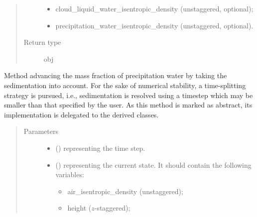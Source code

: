 \documentclass[letterpaper,10pt,english]{sphinxmanual}
\begin{document}
\begin{fulllineitems}
\begin{fulllineitems}
\begin{quote}
\begin{description}
\begin{itemize}
\item {} 
cloud\_liquid\_water\_isentropic\_density (unstaggered, optional);

\item {} 
precipitation\_water\_isentropic\_density (unstaggered, optional).

\end{itemize}


\item[{Return type}] \leavevmode
obj

\end{description}\end{quote}

\end{fulllineitems}


\begin{fulllineitems}
\label{\detokenize{api:dycore.prognostic_isentropic.PrognosticIsentropic.step_integrating_sedimentation_flux}}
Method advancing the mass fraction of precipitation water by taking the sedimentation into account.
For the sake of numerical stability, a time-splitting strategy is pursued, i.e., sedimentation is resolved
using a timestep which may be smaller than that specified by the user.
As this method is marked as abstract, its implementation is delegated to the derived classes.
\begin{quote}\begin{description}
\item[{Parameters}] \leavevmode\begin{itemize}
\item {} 
 () \textendash{}  representing the time step.

\item {} 
 () \textendash{} 
 representing the current state.
It should contain the following variables:
\begin{itemize}
\item {} 
air\_isentropic\_density (unstaggered);

\item {} 
height (\(z\)-staggered);


\end{itemize}
\end{itemize}
\end{description}
\end{quote}
\end{fulllineitems}
\end{fulllineitems}
\end{document}
